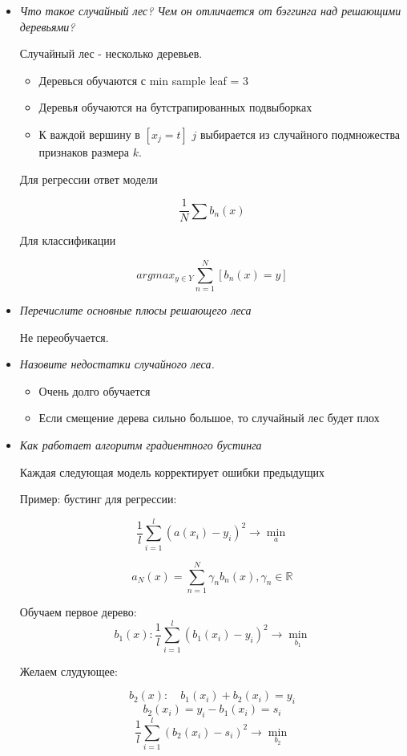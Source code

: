 \documentclass[a4paper]{article}
\begin{document}
\begin{itemize}
\item \textit{Что такое случайный лес? Чем он отличается от бэггинга над решающими
деревьями?}

Случайный лес - несколько деревьев.

\begin{itemize}
\item Деревься обучаются с min sample leaf = 3
\item Деревья обучаются на бутстрапированных подвыборках
\item К важдой вершину в $[x_j = t]$ $j$ выбирается из случайного подмножества признаков размера $k$.
\end{itemize}

Для регрессии ответ модели 

\[ \frac{1}{N} \sum b_n(x) \]

Для классификации

\[ argmax_{y \in Y} \sum_{n=1}^N [b_n(x) = y] \]

\item \textit{Перечислите основные плюсы решающего леса}

Не переобучается.

\item \textit{Назовите недостатки случайного леса.}

\begin{itemize}
\item Очень долго обучается
\item Если смещение дерева сильно большое, то случайный лес будет плох
\end{itemize}

\item \textit{Как работает алгоритм градиентного бустинга}

Каждая следующая модель корректирует ошибки предыдущих

Пример: бустинг для регрессии:

\[ \frac{1}{l} \sum_{i=1}^l (a(x_i) - y_i)^2 \rightarrow \min_a \]

\[a_N(x) = \sum_{n=1}^N \gamma_n b_n(x), \gamma_n \in \mathbb{R} \]

Обучаем первое дерево:
\[ b_1(x): \frac{1}{l} \sum_{i=1}^l (b_1(x_i)-y_i)^2 \rightarrow \min_{b_1} \]

Желаем слудующее:

\[ b_2(x): \quad b_1(x_i) + b_2(x_i) = y_i \]
\[ b_2(x_i) = y_i - b_1(x_i) = s_i \]
\[ \frac{1}{l} \sum_{i=1}^l (b_2(x_i)-s_i)^2 \rightarrow \min_{b_2} \]


\end{itemize}
\end{document}
